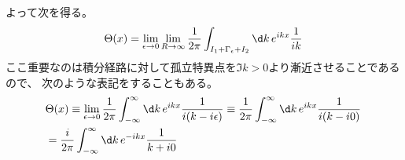 よって次を得る。
\begin{equation}
  \Theta(x)
  =\lim_{\epsilon\rightarrow0}\lim_{R\rightarrow\infty}
  \frac{1}{2\pi}\int_{I_1+\Gamma_\epsilon+I_2}\d k\,e^{ikx}\frac{1}{ik}
\end{equation}
ここ重要なのは積分経路に対して孤立特異点を$\Im k>0$より漸近させることであるので、
次のような表記をすることもある。
\begin{equation}
  \label{eq:step_func_complex_fourier}
  \begin{split}
    &\Theta(x)
    \equiv\lim_{\epsilon\rightarrow0}
    \frac{1}{2\pi}\int_{-\infty}^\infty\d k\,e^{ikx}\frac{1}{i(k-i\epsilon)}
    \equiv\frac{1}{2\pi}\int_{-\infty}^\infty\d k\,e^{ikx}\frac{1}{i(k-i0)} \\
    &=\frac{i}{2\pi}\int_{-\infty}^\infty\d k\,e^{-ikx}\frac{1}{k+i0} \\
  \end{split}
\end{equation}


